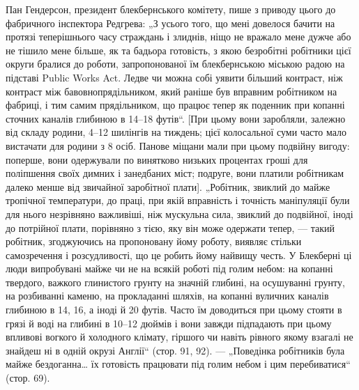 Пан Гендерсон, президент блекбернського комітету, пише
з приводу цього до фабричного інспектора Редгрева: „З усього
того, що мені довелося бачити на протязі теперішнього часу
страждань і злиднів, ніщо не вражало мене дужче або не тішило
мене більше, як та бадьора готовість, з якою безробітні
робітники цієї округи бралися до роботи, запропонованої їм
блекбернською міською радою на підставі Public Works Act.
Ледве чи можна собі уявити більший контраст, ніж контраст
між бавовнопрядільником, який раніше був вправним робітником
на фабриці, і тим самим прядільником, що працює тепер як
поденник при копанні сточних каналів глибиною в 14--18 футів“.
[При цьому вони заробляли, залежно від складу родини, 4--12
шилінгів на тиждень; цієї колосальної суми часто мало вистачати
для родини з 8 осіб. Панове міщани мали при цьому подвійну
вигоду: поперше, вони одержували по винятково низьких
процентах гроші для поліпшення своїх димних і занедбаних
міст; подруге, вони платили робітникам далеко менше від звичайної
заробітної плати]. „Робітник, звиклий до майже тропічної
температури, до праці, при якій вправність і точність маніпуляції
були для нього незрівняно важливіші, ніж мускульна сила,
звиклий до подвійної, іноді до потрійної плати, порівняно з тією,
яку він може одержати тепер, — такий робітник, згоджуючись
на пропоновану йому роботу, виявляє стільки самозречення
і розсудливості, що це робить йому найвищу честь. У Блекберні
ці люди випробувані майже чи не на всякій роботі під голим
небом: на копанні твердого, важкого глинистого грунту на
значній глибині, на осушуванні грунту, на розбиванні каменю,
на прокладанні шляхів, на копанні вуличних каналів глибиною
в 14, 16, а іноді й 20 футів. Часто їм доводиться при цьому
стояти в грязі й воді на глибині в 10--12 дюймів і вони завжди
підпадають при цьому впливові вогкого й холодного клімату,
гіршого чи навіть рівного якому взагалі не знайдеш ні в одній
окрузі Англії“ (стор. 91, 92). — „Поведінка робітників була майже
бездоганна\dots{} їх готовість працювати під голим небом і цим
перебиватися“ (стор. 69).


